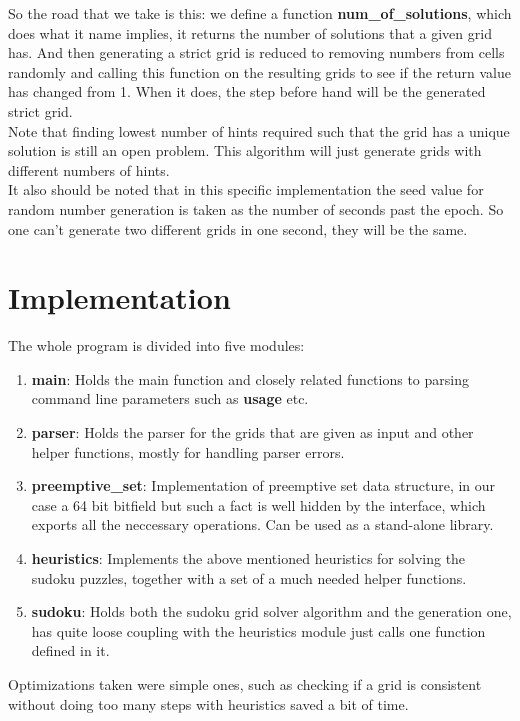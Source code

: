 \documentclass[english,a4paper]{article}
\begin{document}
So the road that we take is this: we define a function
\textbf{num\_of\_solutions}, which does what it name implies, it returns
the number of solutions that a given grid has. And then generating a
strict grid is reduced to removing numbers from cells randomly and
calling this function on the resulting grids to see if the return
value has changed from 1. When it does, the step before hand will be
the generated strict grid.\\

Note that finding lowest number of hints required such that the grid
has a unique solution is still an open problem. This algorithm will
just generate grids with different numbers of hints.\\

It also should be noted that in this specific implementation the seed
value for random number generation is taken as the number of seconds
past the epoch. So one can't generate two different grids in one
second, they will be the same.

\section{Implementation}

The whole program is divided into five modules: 
\begin{enumerate}
\item \textbf{main}: Holds the main function and closely related
  functions to parsing command line parameters such as \textbf{usage}
  etc.
\item \textbf{parser}: Holds the parser for the grids that are given
  as input and other helper functions, mostly for handling parser
  errors.
\item \textbf{preemptive\_set}: Implementation of preemptive set data
  structure, in our case a 64 bit bitfield but such a fact is well
  hidden by the interface, which exports all the neccessary operations.
  Can be used as a stand-alone library.
\item \textbf{heuristics}: Implements the above mentioned heuristics
  for solving the sudoku puzzles, together with a set of a much needed
  helper functions.
\item \textbf{sudoku}: Holds both the sudoku grid solver algorithm and
  the generation one, has quite loose coupling with the heuristics
  module just calls one function defined in it. 
\end{enumerate}

Optimizations taken were simple ones, such as checking if a grid is
consistent without doing too many steps with heuristics saved a bit of
time.\\ 
\end{document}
